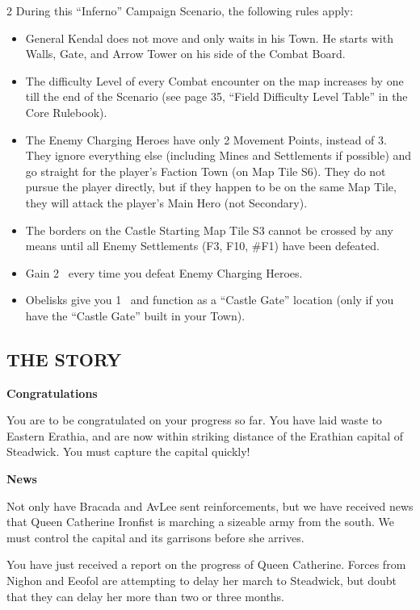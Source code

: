 \begin{multicols*}{2}
During this ``Inferno'' Campaign Scenario, the following rules apply:

\begin{itemize}
    \item General Kendal does not move and only waits in his Town. He starts with Walls, Gate,
      and Arrow Tower on his side of the Combat Board.
    \item The difficulty Level of every Combat encounter on the map increases by one till the end of the Scenario
      (see page 35, ``Field Difficulty Level Table'' in the Core Rulebook).
    \item The Enemy Charging Heroes have only 2 Movement Points, instead of 3. They ignore everything else
      (including Mines and Settlements if possible) and go straight for the player's Faction Town (on Map Tile S6).
      They do not pursue the player directly, but if they happen to be on the same Map Tile, they will
      attack the player's Main Hero (not Secondary).
    \item The borders on the Castle Starting Map Tile S3 cannot be crossed by any means until
      all Enemy Settlements (F3, F10, \#F1) have been defeated.
    \item Gain 2~ every time you defeat Enemy Charging Heroes.
    \item Obelisks give you 1~ and function as a ``Castle Gate'' location (only if you have the ``Castle Gate'' built in your Town).
\end{itemize}

\subsection*{\MakeUppercase{The Story}}

\textbf{Congratulations}

You are to be congratulated on your progress so far.
You have laid waste to Eastern Erathia, and are now within striking distance of the Erathian capital of Steadwick.
You must capture the capital quickly!

\textbf{News}

Not only have Bracada and AvLee sent reinforcements, but we have received news that Queen Catherine Ironfist is marching a sizeable army from the south.
We must control the capital and its garrisons before she arrives.

You have just received a report on the progress of Queen Catherine.
Forces from Nighon and Eeofol are attempting to delay her march to Steadwick, but doubt that they can delay her more than two or three months.


\end{multicols*}
